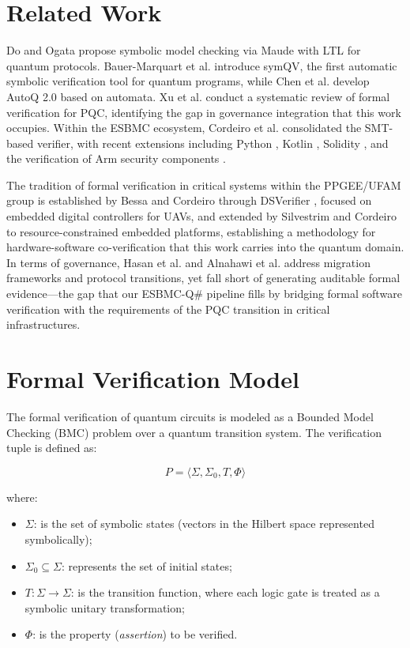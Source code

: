 \documentclass[journal]{IEEEtran} %
\begin{document}
\section{Related Work}

Do and Ogata \cite{ref14} propose symbolic model checking via Maude with LTL for quantum protocols. Bauer-Marquart et al. \cite{ref7} introduce symQV, the first automatic symbolic verification tool for quantum programs, while Chen et al. \cite{ref15} develop AutoQ 2.0 based on automata. Xu et al. \cite{ref16} conduct a systematic review of formal verification for PQC, identifying the gap in governance integration that this work occupies. Within the ESBMC ecosystem, Cordeiro et al. \cite{ref8,ref9,ref10} consolidated the SMT-based verifier, with recent extensions including Python \cite{ref11}, Kotlin \cite{ref17}, Solidity \cite{ref18}, and the verification of Arm security components \cite{ref12}.

The tradition of formal verification in critical systems within the PPGEE/UFAM group is established by Bessa and Cordeiro through DSVerifier \cite{ref19,ref20}, focused on embedded digital controllers for UAVs, and extended by Silvestrim and Cordeiro \cite{ref24} to resource-constrained embedded platforms, establishing a methodology for hardware-software co-verification that this work carries into the quantum domain. In terms of governance, Hasan et al. \cite{ref21} and Alnahawi et al. \cite{ref22} address migration frameworks and protocol transitions, yet fall short of generating auditable formal evidence---the gap that our ESBMC-Q\# pipeline fills by bridging formal software verification with the requirements of the PQC transition in critical infrastructures.

\section{Formal Verification Model}
The formal verification of quantum circuits is modeled as a Bounded Model Checking (BMC) problem over a quantum transition system. The verification tuple is defined as:

\begin{equation}
    P = \langle \Sigma, \Sigma_0, T, \Phi \rangle
\end{equation}

\noindent where:
\begin{itemize}
    \item $\Sigma$: is the set of symbolic states (vectors in the Hilbert space represented symbolically);
    \item $\Sigma_0 \subseteq \Sigma$: represents the set of initial states;
    \item $T : \Sigma \rightarrow \Sigma$: is the transition function, where each logic gate is treated as a symbolic unitary transformation;
    \item $\Phi$: is the property (\textit{assertion}) to be verified.
\end{itemize}
\end{document}
